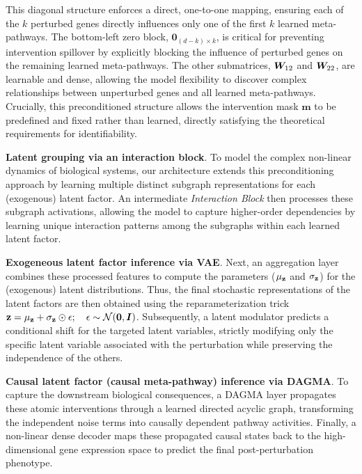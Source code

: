 \documentclass[10pt,letterpaper]{article}
\def\vzero{{\bm{0}}}\def\vone{{\bm{1}}}
\def\vm{{\bm{m}}}\def\vn{{\bm{n}}}\def\vo{{\bm{o}}}
\theoremstyle{definition}
\theoremstyle{remark}
\newcommand{\vect}[1]{\mathbf{\MakeLowercase{#1}}}
\newcommand{\latentvars}{\rvz}
\newcommand{\weightmatrix}{\mW}
\newcommand{\identitymatrix}{\mI}
\newcommand{\latentdim}{d}
\newcommand{\numperturbedgenes}{k}
\newcommand{\maskvector}{\vm}
\newcommand{\normaldist}{\gN}
\begin{document}
This diagonal structure enforces a direct, one-to-one mapping, ensuring each of the $\numperturbedgenes$ perturbed genes directly influences only one of the first $\numperturbedgenes$ learned meta-pathways.
The bottom-left zero block, $\vzero_{(\latentdim-\numperturbedgenes) \times \numperturbedgenes}$, is critical for preventing intervention spillover by explicitly blocking the influence of perturbed genes on the remaining learned meta-pathways.
The other submatrices, $\weightmatrix_{12}$ and $\weightmatrix_{22}$, are learnable and dense, allowing the model flexibility to discover complex relationships between unperturbed genes and all learned meta-pathways.
Crucially, this preconditioned structure allows the intervention mask $\maskvector$ to be predefined and fixed rather than learned, directly satisfying the theoretical requirements for identifiability.

\textbf{Latent grouping via an interaction block}. To model the complex non-linear dynamics of biological systems, our architecture extends this preconditioning approach by learning multiple distinct subgraph representations for each (exogenous) latent factor.
An intermediate \emph{Interaction Block} then processes these subgraph activations, allowing the model to capture higher-order dependencies by learning unique interaction patterns among the subgraphs within each learned latent factor.

\textbf{Exogeneous latent factor inference via VAE}. Next, an aggregation layer combines these processed features to compute the parameters ($\vect{\mu}_{\latentvars}$ and $\vect{\sigma}_{\latentvars}$) for the (exogenous) latent distributions.
Thus, the final stochastic representations of the latent factors are then obtained using the reparameterization trick $\latentvars = \vect{\mu}_{\latentvars} + \vect{\sigma}_{\latentvars} \odot \vect{\epsilon}; \quad \vect{\epsilon} \sim \normaldist(\vect{0}, \identitymatrix)$.
Subsequently, a latent modulator predicts a conditional shift for the targeted latent variables, strictly modifying only the specific latent variable associated with the perturbation while preserving the independence of the others.

\textbf{Causal latent factor (causal meta-pathway) inference via DAGMA}. To capture the downstream biological consequences, a DAGMA layer propagates these atomic interventions through a learned directed acyclic graph, transforming the independent noise terms into causally dependent pathway activities.
Finally, a non-linear dense decoder maps these propagated causal states back to the high-dimensional gene expression space to predict the final post-perturbation phenotype.
\end{document}
